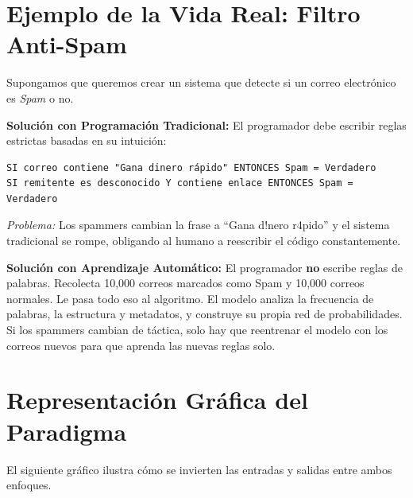 \section{Ejemplo de la Vida Real: Filtro Anti-Spam}

Supongamos que queremos crear un sistema que detecte si un correo electrónico es \textit{Spam} o no.

\vspace{0.3cm}
\noindent \textbf{Solución con Programación Tradicional:}
El programador debe escribir reglas estrictas basadas en su intuición:
\begin{verbatim}
SI correo contiene "Gana dinero rápido" ENTONCES Spam = Verdadero
SI remitente es desconocido Y contiene enlace ENTONCES Spam = Verdadero
\end{verbatim}
\textit{Problema:} Los spammers cambian la frase a ``Gana d!nero r4pido'' y el sistema tradicional se rompe, obligando al humano a reescribir el código constantemente.

\vspace{0.3cm}
\noindent \textbf{Solución con Aprendizaje Automático:}
El programador \textbf{no} escribe reglas de palabras. Recolecta 10,000 correos marcados como Spam y 10,000 correos normales. Le pasa todo eso al algoritmo. El modelo analiza la frecuencia de palabras, la estructura y metadatos, y construye su propia red de probabilidades. Si los spammers cambian de táctica, solo hay que reentrenar el modelo con los correos nuevos para que aprenda las nuevas reglas solo.

\vspace{0.5cm}

\section{Representación Gráfica del Paradigma}
El siguiente gráfico ilustra cómo se invierten las entradas y salidas entre ambos enfoques.

